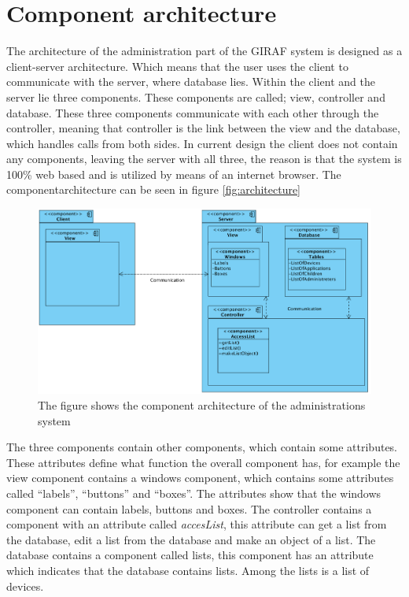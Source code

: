 \section{Component architecture}

The architecture of the administration part of the GIRAF system is designed as a client-server architecture. Which means that the user uses the client to communicate with the server, where database lies. Within the client and the server lie three components. These components are called; view, controller and database. These three components communicate with each other through the controller, meaning that controller is the link between the view and the database, which handles calls from both sides. In current design the client does not contain any components, leaving the server with all three, the reason is that the system is 100\% web based and is utilized by means of an internet browser. The componentarchitecture can be seen in figure \vref{fig:architecture}

\begin{figure}[!ht]
\centering
\includegraphics[width=1.0\textwidth]{img/ComponentArketektur.png}
\caption{The figure shows the component architecture of the administrations system}
\label{fig:architecture}
\end{figure}

The three components contain other components, which contain some attributes. These attributes define what function the overall component has, for example the view component contains a windows component, which contains some attributes called ``labels'', ``buttons'' and ``boxes''. The attributes show that the windows component can contain labels, buttons and boxes.
The controller contains a component with an attribute called \emph{accesList}, this attribute can get a list from the database, edit a list from the database and make an object of a list.
The database contains a component called lists, this component has an attribute which indicates that the database contains lists. Among the lists is a list of devices.